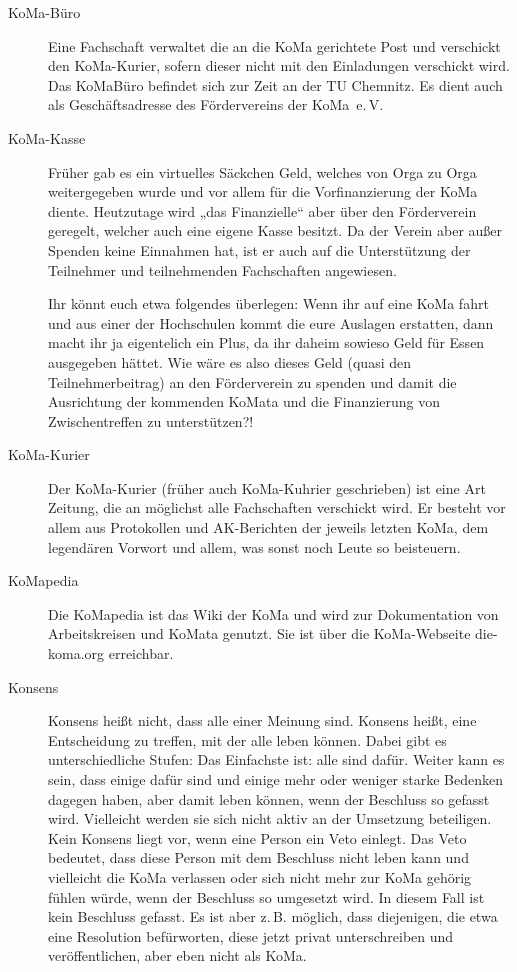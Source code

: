 \documentclass{neulingsheft}
\begin{document}
{\begin{description}
\item[KoMa-Büro] Eine Fachschaft verwaltet die an die KoMa gerichtete Post und
	verschickt den KoMa-Kurier, sofern dieser nicht mit den Einladungen
	verschickt wird. Das KoMaBüro befindet sich zur Zeit an der TU Chemnitz. Es
	dient auch als Geschäftsadresse des Fördervereins der KoMa~e.\,V.

\item[KoMa-Kasse] Früher gab es ein virtuelles Säckchen Geld, welches von Orga
	zu Orga weitergegeben wurde und vor allem für die Vorfinanzierung der KoMa
	diente. Heutzutage wird „das Finanzielle“ aber über den Förderverein
	geregelt, welcher auch eine eigene Kasse besitzt. Da der Verein aber außer
	Spenden keine Einnahmen hat, ist er auch auf die Unterstützung der
	Teilnehmer und teilnehmenden Fachschaften angewiesen.

	Ihr könnt euch etwa folgendes überlegen: Wenn ihr auf eine KoMa fahrt und
	aus einer der Hochschulen kommt die eure Auslagen erstatten, dann macht ihr
	ja eigentelich ein Plus, da ihr daheim sowieso Geld für Essen ausgegeben
	hättet.  Wie wäre es also dieses Geld (quasi den Teilnehmerbeitrag) an den
	Förderverein zu spenden und damit die Ausrichtung der kommenden KoMata und
	die Finanzierung von Zwischentreffen zu unterstützen?!

\item[KoMa-Kurier] Der KoMa-Kurier (früher auch KoMa-Kuhrier geschrieben) ist
	eine Art Zeitung, die an möglichst alle Fachschaften verschickt wird. Er
	besteht vor allem aus Protokollen und AK-Berichten der jeweils letzten
	KoMa, dem legendären Vorwort und allem, was sonst noch Leute so beisteuern.

\item[KoMapedia] Die KoMapedia ist das Wiki der KoMa und wird zur Dokumentation
	von Arbeitskreisen und KoMata genutzt. Sie ist über die KoMa-Webseite
	die-koma.org erreichbar.

\item[Konsens] Konsens heißt nicht, dass alle einer Meinung sind.  Konsens
	heißt, eine Entscheidung zu treffen, mit der alle leben können. Dabei gibt
	es unterschiedliche Stufen: Das Einfachste ist: alle sind dafür. Weiter
	kann es sein, dass einige dafür sind und einige mehr oder weniger starke
	Bedenken dagegen haben, aber damit leben können, wenn der Beschluss so
	gefasst wird. Vielleicht werden sie sich nicht aktiv an der Umsetzung
	beteiligen. Kein Konsens liegt vor, wenn eine Person ein Veto einlegt. Das
	Veto bedeutet, dass diese Person mit dem Beschluss nicht leben kann und
	vielleicht die KoMa verlassen oder sich nicht mehr zur KoMa gehörig fühlen
	würde, wenn der Beschluss so umgesetzt wird. In diesem Fall ist kein
	Beschluss gefasst.  Es ist aber z.\,B. möglich, dass diejenigen, die etwa
	eine Resolution befürworten, diese jetzt privat unterschreiben und
	veröffentlichen, aber eben nicht als KoMa.


\end{description}}
\end{document}
